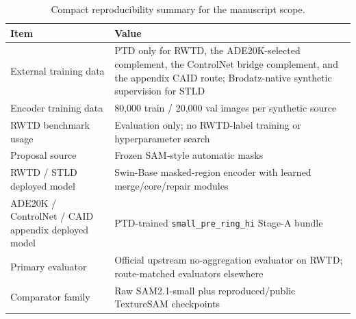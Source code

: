 \begin{table}[t]
\centering
\small
\begin{tabularx}{\textwidth}{@{}p{}X@{}}
\toprule
Item & Value \\
\midrule
External training data & PTD only for RWTD, the ADE20K-selected complement, the ControlNet bridge complement, and the appendix CAID route; Brodatz-native synthetic supervision for STLD \\
Encoder training data & 80{,}000 train / 20{,}000 val images per synthetic source \\
RWTD benchmark usage & Evaluation only; no RWTD-label training or hyperparameter search \\
Proposal source & Frozen SAM-style automatic masks \\
RWTD / STLD deployed model & Swin-Base masked-region encoder with learned merge/core/repair modules \\
ADE20K / ControlNet / CAID appendix deployed model & PTD-trained \texttt{small\_pre\_ring\_hi} Stage-A bundle \\
Primary evaluator & Official upstream no-aggregation evaluator on RWTD; route-matched evaluators elsewhere \\
Comparator family & Raw SAM2.1-small plus reproduced/public TextureSAM checkpoints \\
\bottomrule
\end{tabularx}
\caption{Compact reproducibility summary for the manuscript scope.}
\label{tab:compact_repro}
\end{table}
